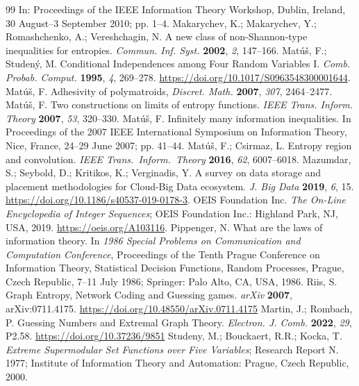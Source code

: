 \documentclass[reqno]{amsart}
\theoremstyle{definition}
\begin{document}
\begin{thebibliography}{99}
  In: Proceedings of the IEEE Information Theory Workshop, Dublin, Ireland,
  30 August–3 September 2010; pp. 1--4.
%
 Makarychev, K.; Makarychev, Y.; Romashchenko, A.; Vereshchagin, N. 
  A new class of non-Shannon-type inequalities for entropies.
  \emph{Commun. Inf. Syst.} \textbf{2002}, {\emph{2}}, 147--166.
%
 Mat\'u\v{s}, F.; Studen\'y, M.
  Conditional Independences among Four Random Variables I.
  \emph{Comb. Probab. Comput.} \textbf{1995}, {\emph{4}}, 269--278.
  \url{https://doi.org/10.1017/S0963548300001644}.
%
 Mat\'u\v{s}, F. 
  Adhesivity of polymatroids,
  \emph{Discret. Math.} \textbf{2007}, {\emph{307}}, 2464--2477.
%
  Mat\'{u}\v{s}, F.
  Two constructions on limits of entropy functions.
   \emph{IEEE Trans. Inform. Theory} \textbf{2007}, \emph{53}, 320--330.
%
 Mat\'{u}\v{s}, F.
   Infinitely many information inequalities.
   In Proceedings of the 2007 IEEE International Symposium on Information Theory,
   Nice, France, 24--29 June 2007; pp. 41--44.
%
  Mat\'{u}\v{s}, F.; Csirmaz, L.
   Entropy region and convolution.
   \emph{IEEE Trans.\ Inform.\ Theory}  \textbf{2016}, {\emph{62}}, 6007--6018.
%
 Mazumdar, S.; Seybold, D.; Kritikos, K.; Verginadis, Y. 
 A survey on data storage and placement methodologies for Cloud-Big Data ecosystem.
 \emph{J. Big Data} \textbf{2019}, {\emph{6}}, 15.
 \url{https://doi.org/10.1186/s40537-019-0178-3}.
%
 OEIS Foundation Inc.  
  \emph{The On-Line Encyclopedia of Integer Sequences}; OEIS Foundation Inc.: Highland Park, NJ, USA, 2019.
  \url{https://oeis.org/A103116}.
%
 Pippenger, N.
  What are the laws of information theory.
  In \emph{1986 Special Problems on Communication and Computation Conference},
  Proceedings of the Tenth Prague Conference on Information Theory, Statistical
  Decision Functions, Random Processes, Prague, Czech Republic, 7--11 July 1986; 
  Springer: Palo Alto, CA, USA, 1986.
%
 Riis, S.
  Graph Entropy, Network Coding and Guessing games.
  \emph{arXiv} \textbf{2007}, arXiv:0711.4175.
  \url{https://doi.org/10.48550/arXiv.0711.4175}
%
 Martin, J.; Rombach, P.
  Guessing Numbers and Extremal Graph Theory.
  \emph{Electron. J. Comb.} \textbf{2022}, \emph{29}, P2.58.
  \url{https://doi.org/10.37236/9851}
%
 Studeny, M.; Bouckaert, R.R.; Kocka, T. 
  \emph{Extreme Supermodular Set Functions over Five Variables}; 
  {Research Report} N. 1977;
   Institute of Information Theory and Automation: Prague, Czech Republic, 2000.

\end{thebibliography}
\end{document}

